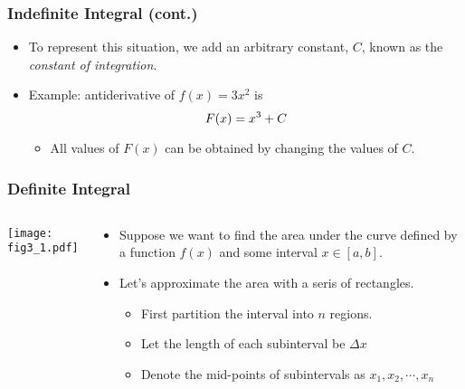 \documentclass[pdflatex, 12pt]{beamer}
\begin{document}
\begin{frame}
\frametitle{Indefinite Integral (cont.)}
\begin{itemize}
\item To represent this situation, we add an arbitrary constant, $C$, known as the \emph{constant of integration}.
\vspace{0.4cm}
\item Example: antiderivative of $f(x) = 3x^2$ is 
 \begin{equation}
 F(x) = x^3 + C \notag
 \end{equation}
 \begin{itemize}
 \item All values of $F(x)$ can be obtained by changing the values of $C$.
 \end{itemize}
\end{itemize}	
\end{frame}

\begin{frame}
\frametitle{Definite Integral}
\begin{columns}
\begin{column}{0.5\textwidth}
\texttt{[image: fig3\_1.pdf]}
\end{column}
\begin{column}{0.5\textwidth}
\begin{itemize}
\item Suppose we want to find the area under the curve defined by a function $f(x)$ and some interval $x \in [a, b]$.
\vspace{0.4cm}
\item Let's approximate the area with a seris of rectangles.
 \begin{itemize}
 \item First partition the interval into $n$ regions.
 \item Let the length of each subinterval be $\Delta x$
 \item Denote the mid-points of subintervals as $x_1, x_2, \cdots, x_n$ 
 \end{itemize}
\end{itemize}
\end{column}
\end{columns}
\end{frame}
\end{document}

